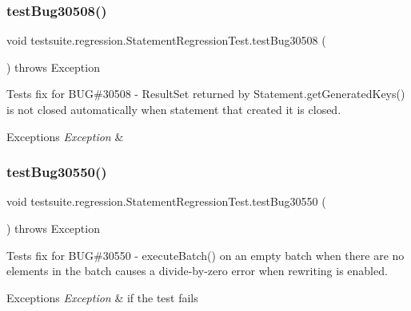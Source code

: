 \subsubsection{\texorpdfstring{test\+Bug30508()}{testBug30508()}}
{\footnotesize\ttfamily void testsuite.\+regression.\+Statement\+Regression\+Test.\+test\+Bug30508 (\begin{DoxyParamCaption}{ }\end{DoxyParamCaption}) throws Exception}

Tests fix for B\+UG\#30508 -\/ Result\+Set returned by Statement.\+get\+Generated\+Keys() is not closed automatically when statement that created it is closed.


\begin{DoxyExceptions}{Exceptions}
{\em Exception} & \\
\hline
\end{DoxyExceptions}
\mbox{\label{classtestsuite_1_1regression_1_1_statement_regression_test_a04e7c997d4e285f4538f897d61c1110e}} 
\subsubsection{\texorpdfstring{test\+Bug30550()}{testBug30550()}}
{\footnotesize\ttfamily void testsuite.\+regression.\+Statement\+Regression\+Test.\+test\+Bug30550 (\begin{DoxyParamCaption}{ }\end{DoxyParamCaption}) throws Exception}

Tests fix for B\+UG\#30550 -\/ execute\+Batch() on an empty batch when there are no elements in the batch causes a divide-\/by-\/zero error when rewriting is enabled.


\begin{DoxyExceptions}{Exceptions}
{\em Exception} & if the test fails \\
\hline
\end{DoxyExceptions}
\mbox{\label{classtestsuite_1_1regression_1_1_statement_regression_test_a9c642be3e679b82dbf2a033e2f09e90b}} 
